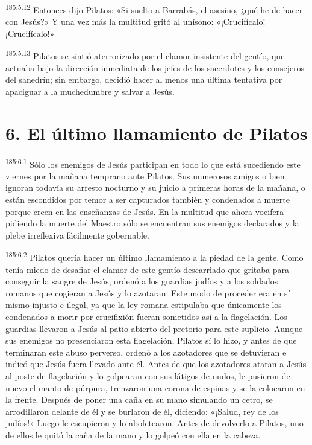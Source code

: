 \par 
\textsuperscript{185:5.12} Entonces dijo Pilatos: «Si suelto a Barrabás, el asesino, ¿qué he de hacer con Jesús?» Y una vez más la multitud gritó al unísono: «¡Crucifícalo! ¡Crucifícalo!»

\par 
\textsuperscript{185:5.13} Pilatos se sintió aterrorizado por el clamor insistente del gentío, que actuaba bajo la dirección inmediata de los jefes de los sacerdotes y los consejeros del sanedrín; sin embargo, decidió hacer al menos una última tentativa por apaciguar a la muchedumbre y salvar a Jesús.

\section*{6. El último llamamiento de Pilatos}
\par 
\textsuperscript{185:6.1} Sólo los enemigos de Jesús participan en todo lo que está sucediendo este viernes por la mañana temprano ante Pilatos. Sus numerosos amigos o bien ignoran todavía su arresto nocturno y su juicio a primeras horas de la mañana, o están escondidos por temor a ser capturados también y condenados a muerte porque creen en las enseñanzas de Jesús. En la multitud que ahora vocifera pidiendo la muerte del Maestro sólo se encuentran sus enemigos declarados y la plebe irreflexiva fácilmente gobernable.

\par 
\textsuperscript{185:6.2} Pilatos quería hacer un último llamamiento a la piedad de la gente. Como tenía miedo de desafiar el clamor de este gentío descarriado que gritaba para conseguir la sangre de Jesús, ordenó a los guardias judíos y a los soldados romanos que cogieran a Jesús y lo azotaran. Este modo de proceder era en sí mismo injusto e ilegal, ya que la ley romana estipulaba que únicamente los condenados a morir por crucifixión fueran sometidos así a la flagelación. Los guardias llevaron a Jesús al patio abierto del pretorio para este suplicio. Aunque sus enemigos no presenciaron esta flagelación, Pilatos sí lo hizo, y antes de que terminaran este abuso perverso, ordenó a los azotadores que se detuvieran e indicó que Jesús fuera llevado ante él. Antes de que los azotadores ataran a Jesús al poste de flagelación y lo golpearan con sus látigos de nudos, le pusieron de nuevo el manto de púrpura, trenzaron una corona de espinas y se la colocaron en la frente. Después de poner una caña en su mano simulando un cetro, se arrodillaron delante de él y se burlaron de él, diciendo: «¡Salud, rey de los judíos!» Luego le escupieron y lo abofetearon. Antes de devolverlo a Pilatos, uno de ellos le quitó la caña de la mano y lo golpeó con ella en la cabeza.

